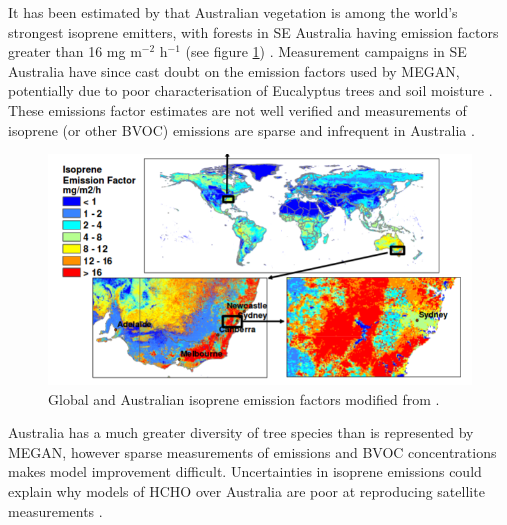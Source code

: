     It has been estimated by that Australian vegetation is among the world's strongest isoprene emitters, with forests in SE Australia having emission factors greater than 16 mg m$^{-2}$ h$^{-1}$ (see figure \ref{LR:Aus:fig_MEGAN_EF}) \parencite{Guenther2006, Guenther2012}.
    Measurement campaigns in SE Australia have since cast doubt on the emission factors used by MEGAN, potentially due to poor characterisation of Eucalyptus trees and soil moisture \parencite{Emmerson2016, Emmerson2019}.
    These emissions factor estimates are not well verified and measurements of isoprene (or other BVOC) emissions are sparse and infrequent in Australia \parencite{Sindelarova2014, Bauwens2016}.
    
    \begin{figure}
      \includegraphics[width=\textwidth]{Figures/MeganIsoprene1_final.png}
      \caption{Global and Australian isoprene emission factors modified from \textcite{Guenther2006}.}
      \label{LR:Aus:fig_MEGAN_EF}
    \end{figure}
    
    
    Australia has a much greater diversity of tree species than is represented by MEGAN, however sparse measurements of emissions and BVOC concentrations makes model improvement difficult.
    Uncertainties in isoprene emissions could explain why models of HCHO over Australia are poor at reproducing satellite measurements \parencite{Stavrakou2009}.
    
